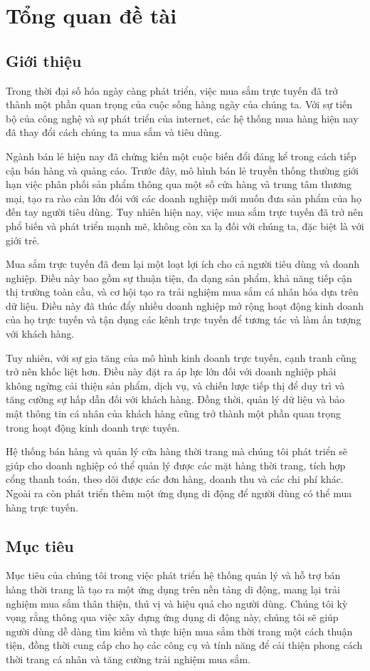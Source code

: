 \section{Tổng quan đề tài}
\subsection{Giới thiệu}
\indent \indent Trong thời đại số hóa ngày càng phát triển, việc mua sắm trực tuyến đã trở thành một phần quan trọng của cuộc sống hàng ngày của chúng ta. Với sự tiến bộ của công nghệ và sự phát triển của internet, các hệ thống mua hàng hiện nay đã thay đổi cách chúng ta mua sắm và tiêu dùng.

Ngành bán lẻ hiện nay đã chứng kiến một cuộc biến đổi đáng kể trong cách tiếp cận bán hàng và quảng cáo. Trước đây, mô hình bán lẻ truyền thống thường giới hạn việc phân phối sản phẩm thông qua một số cửa hàng và trung tâm thương mại, tạo ra rào cản lớn đối với các doanh nghiệp mới muốn đưa sản phẩm của họ đến tay người tiêu dùng. Tuy nhiên hiện nay, việc mua sắm trực tuyến đã trở nên phổ biến và phát triển mạnh mẽ, không còn xa lạ đối với chúng ta, đặc biệt là với giới trẻ.

Mua sắm trực tuyến đã đem lại một loạt lợi ích cho cả người tiêu dùng và doanh nghiệp. Điều này bao gồm sự thuận tiện, đa dạng sản phẩm, khả năng tiếp cận thị trường toàn cầu, và cơ hội tạo ra trải nghiệm mua sắm cá nhân hóa dựa trên dữ liệu. Điều này đã thúc đẩy nhiều doanh nghiệp mở rộng hoạt động kinh doanh của họ trực tuyến và tận dụng các kênh trực tuyến để tương tác và làm ấn tượng với khách hàng.

Tuy nhiên, với sự gia tăng của mô hình kinh doanh trực tuyến, cạnh tranh cũng trở nên khốc liệt hơn. Điều này đặt ra áp lực lớn đối với doanh nghiệp phải không ngừng cải thiện sản phẩm, dịch vụ, và chiến lược tiếp thị để duy trì và tăng cường sự hấp dẫn đối với khách hàng. Đồng thời, quản lý dữ liệu và bảo mật thông tin cá nhân của khách hàng cũng trở thành một phần quan trọng trong hoạt động kinh doanh trực tuyến.

Hệ thống bán hàng và quản lý cửa hàng thời trang mà chúng tôi phát triển sẽ giúp cho doanh nghiệp có thể quản lý được các mặt hàng thời trang, tích hợp cổng thanh toán, theo dõi được các đơn hàng, doanh thu và các chi phí khác. Ngoài ra còn phát triển thêm một ứng dụng di động để người dùng có thể mua hàng trực tuyến.
\subsection{Mục tiêu}
\indent \indent Mục tiêu của chúng tôi trong việc phát triển hệ thống quản lý và hỗ trợ bán hàng thời trang là tạo ra một ứng dụng trên nền tảng di động, mang lại trải nghiệm mua sắm thân thiện, thú vị và hiệu quả cho người dùng. Chúng tôi kỳ vọng rằng thông qua việc xây dựng ứng dụng di động này, chúng tôi sẽ giúp người dùng dễ dàng tìm kiếm và thực hiện mua sắm thời trang một cách thuận tiện, đồng thời cung cấp cho họ các công cụ và tính năng để cải thiện phong cách thời trang cá nhân và tăng cường trải nghiệm mua sắm.

